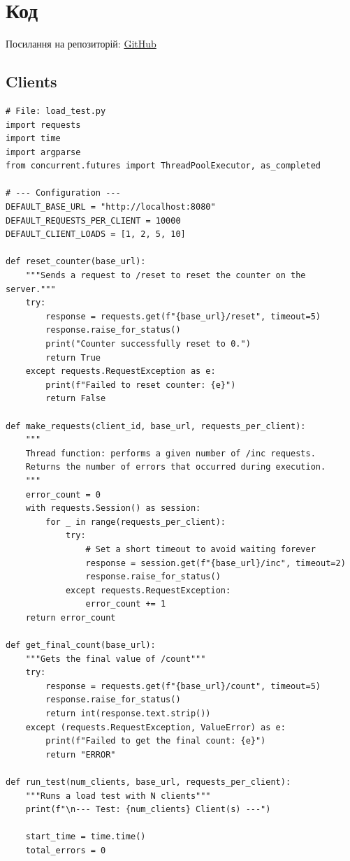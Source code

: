 \documentclass[12pt,a4paper]{article}
\begin{document}
\section{Код}
Посилання на репозиторій: \href{https://github.com/gre1wy/High-Load_Systems/tree/main/lab1}{GitHub}
\subsection{Clients}
\begin{verbatim}
# File: load_test.py
import requests
import time
import argparse
from concurrent.futures import ThreadPoolExecutor, as_completed

# --- Configuration ---
DEFAULT_BASE_URL = "http://localhost:8080"
DEFAULT_REQUESTS_PER_CLIENT = 10000
DEFAULT_CLIENT_LOADS = [1, 2, 5, 10]

def reset_counter(base_url):
    """Sends a request to /reset to reset the counter on the server."""
    try:
        response = requests.get(f"{base_url}/reset", timeout=5)
        response.raise_for_status()
        print("Counter successfully reset to 0.")
        return True
    except requests.RequestException as e:
        print(f"Failed to reset counter: {e}")
        return False

def make_requests(client_id, base_url, requests_per_client):
    """
    Thread function: performs a given number of /inc requests.
    Returns the number of errors that occurred during execution.
    """
    error_count = 0
    with requests.Session() as session:
        for _ in range(requests_per_client):
            try:
                # Set a short timeout to avoid waiting forever
                response = session.get(f"{base_url}/inc", timeout=2)
                response.raise_for_status()
            except requests.RequestException:
                error_count += 1
    return error_count

def get_final_count(base_url):
    """Gets the final value of /count"""
    try:
        response = requests.get(f"{base_url}/count", timeout=5)
        response.raise_for_status()
        return int(response.text.strip())
    except (requests.RequestException, ValueError) as e:
        print(f"Failed to get the final count: {e}")
        return "ERROR"

def run_test(num_clients, base_url, requests_per_client):
    """Runs a load test with N clients"""
    print(f"\n--- Test: {num_clients} Client(s) ---")
    
    start_time = time.time()
    total_errors = 0
    

\end{verbatim}
\end{document}
